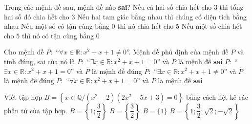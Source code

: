 \begin{ex}%
	Trong các mệnh đề sau, mệnh đề nào \textbf{sai}?
	\choice
	{Nếu cả hai số chia hết cho $3$ thì tổng hai số đó chia hết cho $3$}
	{Nếu hai tam giác bằng nhau thì chúng có diện tích bằng nhau}
	{Nếu một số có tận cùng bằng $0$ thì nó chia hết cho $5$}
	{\True Nếu một số chia hết cho $5$ thì nó có tận cùng bằng $0$}
\end{ex}
\begin{ex}%
	Cho mệnh đề $P \colon$ ``$\forall x \in \mathbb{R} \colon x^2+x+1 \ne 0$''. Mệnh đề phủ định của mệnh đề $P$ và tính đúng, sai của nó là
	\choice
	{\True $\overline{P} \colon$ ``$\exists x \in \mathbb{R} \colon x^2+x+1=0$'' và $\overline{P}$ là mệnh đề \textbf{sai}}
	{$\overline{P} \colon$ ``$\exists x \in \mathbb{R} \colon x^2+x+1=0$'' và $\overline{P}$ là mệnh đề đúng}
	{$\overline{P} \colon$ ``$\exists x \in \mathbb{R} \colon x^2+x+1 \ne 0$'' và $\overline{P}$ là mệnh đề đúng}
	{$\overline{P} \colon$ ``$\forall x \in \mathbb{R} \colon x^2+x+1=0$'' và $\overline{P}$ là mệnh đề \textbf{sai}}
\end{ex}
\begin{ex}%
	Viết tập hợp $B=\left\{ x \in \mathbb{Q}/(x^2-2)(2x^2-5x+3)=0 \right\}$ bằng cách liệt kê các phần tử của tập hợp.
	\choice
	{\True $B=\left\{ 1;\dfrac{3}{2} \right\}$}
	{$B=\left\{ \dfrac{3}{2} \right\}$}
	{$B=\big\{1\big\}$}
	{$B=\left\{ 1;\dfrac{3}{2};\sqrt{2};-\sqrt{2} \right\}$}
\end{ex}
